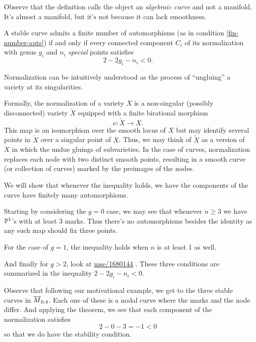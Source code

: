 \documentclass[12pt]{memoir}
\begin{document}
\begin{Rmk}
Observe that the definition calls the object an \emph{algebraic curve} and not a manifold. It's almost a manifold, but it's not because it can lack smoothness.
\end{Rmk}

\begin{Th}
A stable curve admits a finite number of automorphisms (as in condition \ref{fin-number-auts}) if and only if every connected component $C_i$ of its normalization with genus $g_i$ and $n_i$ \emph{special} points satisfies 
$$2-2g_i-n_i<0.$$
\end{Th}

\begin{Rmk} %
Normalization can be intuitively understood as the process of ``ungluing'' a variety at its singularities.\par
Formally, the normalization of a variety $X$ is a non-singular (possibly disconnected) variety $\widetilde X$ equipped with a finite birational morphism 
$$\nu:\widetilde X\to X.$$
This map is an isomorphism over the smooth locus of $X$ but may identify several points in $\widetilde X$ over a singular point of $X$. Thus, we may think of $\widetilde X$ as a version of $X$ in which the undue gluings of subvarieties. In the case of curves, normalization replaces each node with two distinct smooth points, resulting in a smooth curve (or collection of curves) marked by the preimages of the nodes. 
\end{Rmk}

\begin{ptcb}
    We will show that whenever the inequality holds, we have the components of the curve have finitely many automorphisms.\par
    Starting by considering the $g=0$ case, we may see that whenever $n\geq 3$ we have $\mathbb{P}^1$'s with at least 3 marks. Thus there's no automorphisms besides the identity as any such map should fix three points.\par
    For the case of $g=1$, the inequality holds when $n$ is at least 1 as well. \par
    And finally for $g>2$, look at \href{https://math.stackexchange.com/questions/1680144/automorphism-group-of-genus-2-curve}{mse/1680144}
    .
    These three conditions are summarized in the inequality $2-2g_i-n_i<0$.
\end{ptcb}
\begin{Ex}
    Observe that following our motivational example, we get to the three stable curves in $\overline M_{0,4}$. Each one of these is a nodal curve where the marks and the node differ. And applying the theorem, we see that each component of the normalization satisfies
    $$2-0-3=-1<0$$
    so that we do have the stability condition. 
\end{Ex}
\end{document}
